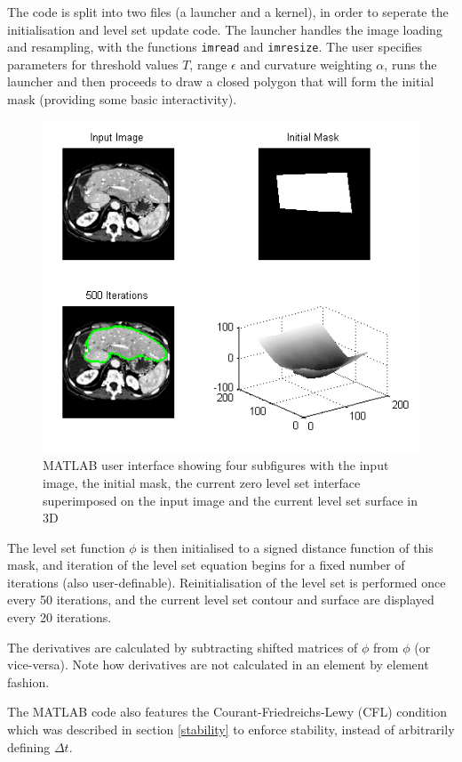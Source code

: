 The code is split into two files (a launcher and a kernel), in order to seperate the initialisation and level set update code. The launcher handles the image loading and resampling, with the functions \texttt{imread} and \texttt{imresize}. The user specifies parameters for threshold values $T$, range $\epsilon$ and curvature weighting $\alpha$, runs the launcher and then proceeds to draw a closed polygon that will form the initial mask (providing some basic interactivity). 

\begin{figure}[h]
	\centering
		\includegraphics[scale=0.6]{images/matlab.png}
	\caption{MATLAB user interface showing four subfigures with the input image, the initial mask, the current zero level set interface superimposed on the input image and the current level set surface in 3D}
	\label{fig:matlab}
\end{figure}

The level set function $\phi$ is then initialised to a signed distance function of this mask, and iteration of the level set equation begins for a fixed number of iterations (also user-definable). Reinitialisation of the level set is performed once every 50 iterations, and the current level set contour and surface are displayed every 20 iterations.

The derivatives are calculated by subtracting shifted matrices of $\phi$ from $\phi$ (or vice-versa). Note how derivatives are not calculated in an element by element fashion.

The MATLAB code also features the Courant-Friedreichs-Lewy (CFL) condition which was described in section \ref{stability} to enforce stability, instead of arbitrarily defining $\Delta t$.

